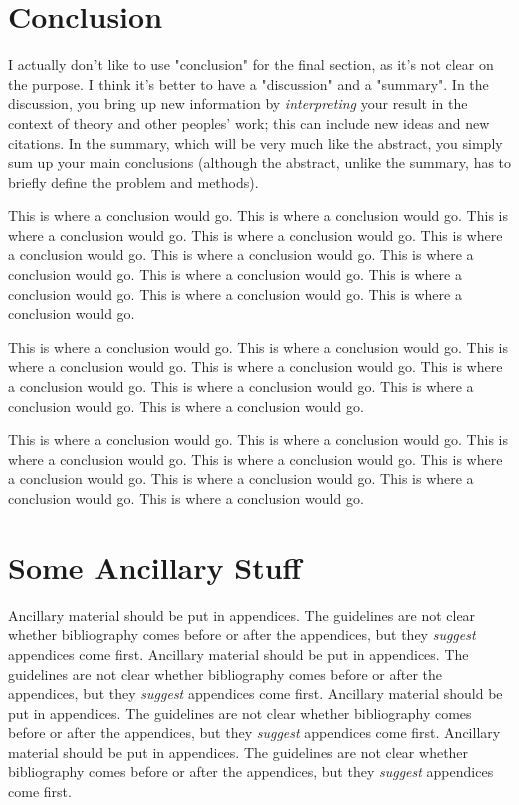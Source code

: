 \documentclass[11pt]{ucscthesisbs}
\begin{document}
\chapter{Conclusion}

I actually don't like to use "conclusion" for the final section, as it's not clear on the purpose.  I think it's better to have a "discussion" and a "summary".  In the discussion, you bring up new information by {\it interpreting} your result in the context of theory and other peoples' work; this can include new ideas and new citations.  In the summary, which will be very much like the abstract, you simply sum up your main conclusions (although the abstract, unlike the summary, has to briefly define the problem and methods).

This is where a conclusion would go.
This is where a conclusion would go.
This is where a conclusion would go.
This is where a conclusion would go.
This is where a conclusion would go.
This is where a conclusion would go.
This is where a conclusion would go.
This is where a conclusion would go.
This is where a conclusion would go.
This is where a conclusion would go.
This is where a conclusion would go.

This is where a conclusion would go.
This is where a conclusion would go.
This is where a conclusion would go.
This is where a conclusion would go.
This is where a conclusion would go.
This is where a conclusion would go.
This is where a conclusion would go.
This is where a conclusion would go.

This is where a conclusion would go.
This is where a conclusion would go.
This is where a conclusion would go.
This is where a conclusion would go.
This is where a conclusion would go.
This is where a conclusion would go.
This is where a conclusion would go.
This is where a conclusion would go.

\appendix
\chapter{Some Ancillary Stuff}

Ancillary material should be put in appendices.  The guidelines are not
clear whether bibliography comes before or after the appendices, but they
\emph{suggest} appendices come first.
Ancillary material should be put in appendices.  The guidelines are not
clear whether bibliography comes before or after the appendices, but they
\emph{suggest} appendices come first.
Ancillary material should be put in appendices.  The guidelines are not
clear whether bibliography comes before or after the appendices, but they
\emph{suggest} appendices come first.
Ancillary material should be put in appendices.  The guidelines are not
clear whether bibliography comes before or after the appendices, but they
\emph{suggest} appendices come first.




\end{document}
